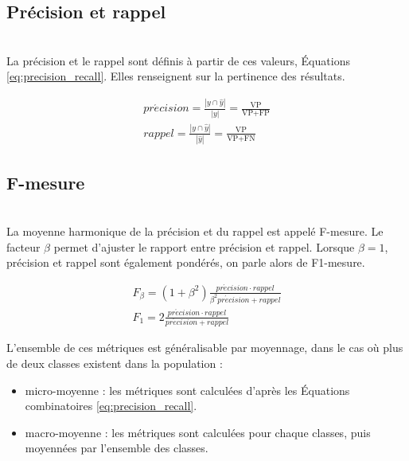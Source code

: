 \subsection{Précision et rappel}\mbox{} \\
La précision et le rappel sont définis à partir de ces valeurs, Équations \ref{eq:precision_recall}.
Elles renseignent sur la pertinence des résultats.

\begin{equation} \label{eq:precision_recall}
\begin{split}
pr\acute{e}cision = \frac{|y \cap \hat{y}|}{|y|} = \frac{\text{VP}}{\text{VP}+\text{FP}}
\\
rappel = \frac{|y \cap \hat{y}|}{|\hat{y}|} = \frac{\text{VP}}{\text{VP}+\text{FN}}
\end{split}
\end{equation}

\subsection{F-mesure}\mbox{} \\
La moyenne harmonique de la précision et du rappel est appelé F-mesure.
Le facteur $\beta$ permet d'ajuster le rapport entre précision et rappel.
Lorsque $\beta = 1$, précision et rappel sont également pondérés, on parle alors de F1-mesure.

\begin{equation} \label{eq:f1_score}
\begin{split}
F_{\beta}=\left(1+\beta^{2}\right) \frac{pr\acute{e}cision \cdot rappel}{\beta^{2} pr\acute{e}cision + rappel}
\\
F_{1}= 2 \frac{pr\acute{e}cision \cdot rappel}{pr\acute{e}cision + rappel}
\end{split}
\end{equation}

L'ensemble de ces métriques est généralisable par moyennage, dans le cas où plus de deux classes existent dans la population :
\begin{itemize}
	\item micro-moyenne : les métriques sont calculées d'après les Équations combinatoires \ref{eq:precision_recall}.
	\item macro-moyenne : les métriques sont calculées pour chaque classes, puis moyennées par l'ensemble des classes.
\end{itemize}

